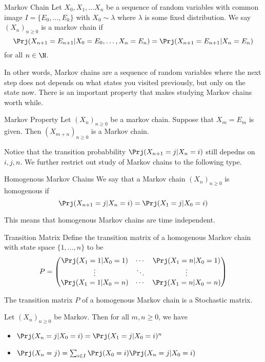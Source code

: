 \documentclass[a4paper]{article}
\begin{document}
\begin{defn}{Markov Chain}{} Let $X_0,X_1,\dots X_n$ be a sequence of random variables with common image $I=\{E_0,\dots,E_k\}$ with $X_0\sim\lambda$ where $\lambda$ is some fixed distribution. We say $(X_n)_{n\geq 0}$ is a markov chain if $$\Prj(X_{n+1}=E_{n+1}|X_0=E_0,\dots,X_n=E_n)=\Prj(X_{n+1}=E_{n+1}|X_n=E_n)$$ for all $n\in\N$. 
\end{defn}

In other words, Markov chains are a sequence of random variables where the next step does not depends on what states you visited previously, but only on the state now. There is an important property that makes studying Markov chains worth while. 

\begin{thm}{Markov Property}{} Let $(X_n)_{n\geq0}$ be a markov chain. Suppose that $X_m=E_m$ is given. Then $(X_{m+n})_{n\geq 0}$ is a Markov chain. 
\end{thm}


Notice that the transition probabbility $\Prj(X_{n+1}=j|X_n=i)$ still depedns on $i,j,n$. We further restrict out study of Markov chains to the following type. 

\begin{defn}{Homogenous Markov Chains}{} We say that a Markov chain $(X_n)_{n\geq 0}$ is homogenous if $$\Prj(X_{n+1}=j|X_n=i)=\Prj(X_1=j|X_0=i)$$
\end{defn}

This means that homogenous Markov chains are time independent. 

\begin{defn}{Transition Matrix}{} Define the transition matrix of a homogenous Markov chain with state space $\{1,\dots,n\}$ to be $$P=\begin{pmatrix}
\Prj(X_1=1|X_0=1) & \cdots & \Prj(X_1=n|X_0=1)\\
\vdots & \ddots & \vdots\\
\Prj(X_1=1|X_0=n) & \cdots & \Prj(X_1=n|X_0=n)
\end{pmatrix}$$
\end{defn}

\begin{lmm}{}{} The transition matrix $P$ of a homogenous Markov chain is a Stochastic matrix. 
\end{lmm}

\begin{thm}{}{} Let $(X_n)_{n\geq 0}$ be Markov. Then for all $m,n\geq0$, we have
\begin{itemize}
\item $\Prj(X_n=j|X_0=i)=\Prj(X_1=j|X_0=i)^n$
\item $\Prj(X_n=j)=\sum_{i\in I}\Prj(X_0=i)\Prj(X_n=j|X_0=i)$
\end{itemize}
\end{thm}
\end{document}
